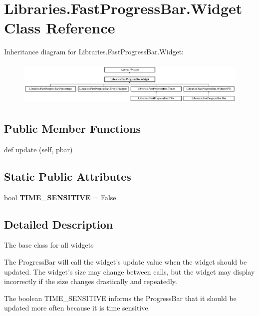 \hypertarget{class_libraries_1_1_fast_progress_bar_1_1_widget}{}\section{Libraries.\+Fast\+Progress\+Bar.\+Widget Class Reference}
\label{class_libraries_1_1_fast_progress_bar_1_1_widget}
Inheritance diagram for Libraries.\+Fast\+Progress\+Bar.\+Widget\+:\begin{figure}[H]
\begin{center}
\leavevmode
\includegraphics[height=2.145594cm]{class_libraries_1_1_fast_progress_bar_1_1_widget}
\end{center}
\end{figure}
\subsection*{Public Member Functions}
\begin{DoxyCompactItemize}
\item 
def \hyperlink{class_libraries_1_1_fast_progress_bar_1_1_widget_a2fafae511db588be3a6a56ef6f22c718}{update} (self, pbar)
\end{DoxyCompactItemize}
\subsection*{Static Public Attributes}
\begin{DoxyCompactItemize}
\item 
bool {\bfseries T\+I\+M\+E\+\_\+\+S\+E\+N\+S\+I\+T\+I\+VE} = False\hypertarget{class_libraries_1_1_fast_progress_bar_1_1_widget_aa75ad542c40a0ea3def0c2a3f7d87097}{}\label{class_libraries_1_1_fast_progress_bar_1_1_widget_aa75ad542c40a0ea3def0c2a3f7d87097}

\end{DoxyCompactItemize}


\subsection{Detailed Description}
\begin{DoxyVerb}The base class for all widgets

The ProgressBar will call the widget's update value when the widget should
be updated. The widget's size may change between calls, but the widget may
display incorrectly if the size changes drastically and repeatedly.

The boolean TIME_SENSITIVE informs the ProgressBar that it should be
updated more often because it is time sensitive.
\end{DoxyVerb}
 

